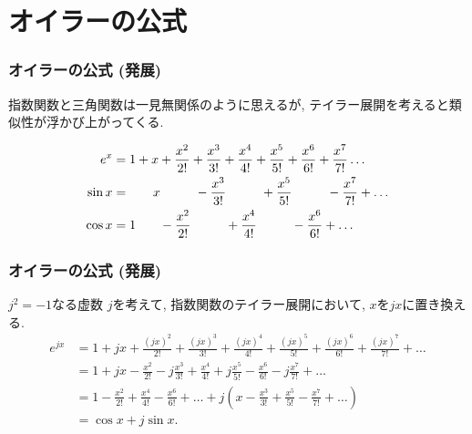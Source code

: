 
\section{オイラーの公式}

\begin{frame}
\frametitle{オイラーの公式 (発展)}

指数関数と三角関数は一見無関係のように思えるが, テイラー展開を考えると類似性が浮かび上がってくる. 

\begin{align*}
e^x & = 1+x+\frac{x^2}{2!}+\frac{x^3}{3!}+\frac{x^4}{4!}+\frac{x^5}{5!}+\frac{x^6}{6!}+\frac{x^7}{7!}\dots \\
\sin x &=   \hspace{6.5mm} x  \hspace{9.5mm}   -\frac{x^3}{3!}  \hspace{9.5mm} +\frac{x^5}{5!} \hspace{9.5mm} -\frac{x^7}{7!} +  \dots  \\
\cos x &= 1   \hspace{6.5mm}  -\frac{x^2}{2!}   \hspace{9.5mm} +\frac{x^4}{4!}   \hspace{9.5mm} -\frac{x^6}{6!} +\dots 
\end{align*}

\end{frame}



\begin{frame}
\frametitle{オイラーの公式 (発展)}

$j^2=-1$なる虚数 $j$を考えて, 指数関数のテイラー展開において, $x$を$jx$に置き換える. 
\begin{align*}
e^{jx} & = 1+jx+\frac{(jx)^2}{2!}+\frac{(jx)^3}{3!}+\frac{(jx)^4}{4!}+\frac{(jx)^5}{5!}+\frac{(jx)^6}{6!}+\frac{(jx)^7}{7!}+\dots \\
& = 1+jx-\frac{x^2}{2!}-j\frac{x^3}{3!}+\frac{x^4}{4!}+j\frac{x^5}{5!}-\frac{x^6}{6!}-j\frac{x^7}{7!}+\dots \\
& = 1  -\frac{x^2}{2!}  +\frac{x^4}{4!}  -\frac{x^6}{6!} +\dots + j(x  -\frac{x^3}{3!}  +\frac{x^5}{5!} -\frac{x^7}{7!} + \dots ) \\
& = \cos x + j \sin x. 
\end{align*}


\end{frame}

